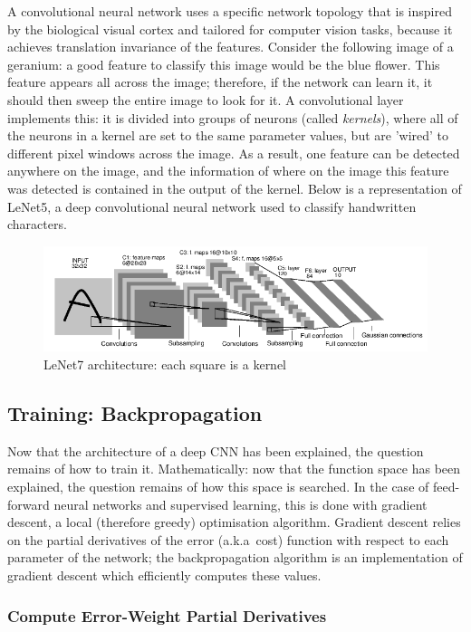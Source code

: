 \documentclass[a4paper,11pt]{article}
\begin{document}
A convolutional neural network uses a specific network topology that is inspired by the biological visual cortex and tailored for computer vision tasks, because it achieves translation invariance of the features. Consider the following image of a geranium: a good feature to classify this image would be the blue flower. This feature appears all across the image; therefore, if the network can learn it, it should then sweep the entire image to look for it. A convolutional layer implements this: it is divided into groups of neurons (called \textit{kernels}), where all of the neurons in a kernel are set to the same parameter values, but are 'wired' to different pixel windows across the image. As a result, one feature can be detected anywhere on the image, and the information of where on the image this feature was detected is contained in the output of the kernel. Below is a representation of LeNet5, a deep convolutional neural network used to classify handwritten characters.

\begin{figure}[h!]
	\centering
	\includegraphics[scale=0.6]{images/lenet5.png}
	\caption{LeNet7 architecture: each square is a kernel}
\end{figure}


\subsection{Training: Backpropagation}

Now that the architecture of a deep CNN has been explained, the question remains of how to train it. Mathematically: now that the function space has been explained, the question remains of how this space is searched. In the case of feed-forward neural networks and supervised learning, this is done with gradient descent, a local (therefore greedy) optimisation algorithm. Gradient descent relies on the partial derivatives of the error (a.k.a\ cost) function with respect to each parameter of the network; the backpropagation algorithm is an implementation of gradient descent which efficiently computes these values.
  
\subsubsection{Compute Error-Weight Partial Derivatives}
\end{document}
